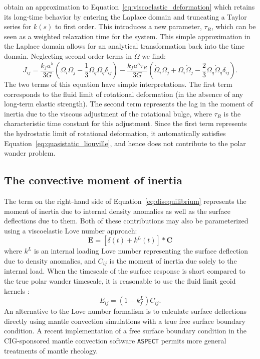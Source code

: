 \documentclass[preprint,12pt,authoryear]{elsarticle}
\begin{document}
\citet{ricard1993polar} obtain an approximation to Equation~\eqref{eq:viscoelastic_deformation} which retains its long-time behavior by entering the Laplace domain and truncating a Taylor series for $k(s)$ to first order.  
This introduces a new parameter, $\tau_R$, which can be seen as a weighted relaxation time for the system.  
This simple approximation in the Laplace domain allows for an analytical transformation back into the time domain. Neglecting second order terms in $\dot{\Omega}$ we find:
\begin{equation}
J_{ij} = \frac{k_f a^5}{3 G} \left( \Omega_i \Omega_j - \frac{1}{3} \Omega_q \Omega_q \delta_{ij} \right) -
 \frac{k_f a^5 \tau_R}{3G} \left(\dot{\Omega}_i \Omega_j + \Omega_i \dot{\Omega}_j - \frac{2}{3} \Omega_q \dot{\Omega}_q \delta_{ij} \right).
\label{eq:rotational_deformation}
\end{equation}
The two terms of this equation have simple interpretations.  
The first term corresponds to the fluid limit of rotational deformation (in the absence of any long-term elastic strength).  
The second term represents the lag in the moment of inertia due to the viscous adjustment of the rotational bulge, where $\tau_R$ is the characteristic time constant for this adjustment.
Since the first term represents the hydrostatic limit of rotational deformation, it automatically satisfies Equation~\eqref{eq:quasistatic_liouville}, and hence does not contribute to the polar wander problem.

\subsection{The convective moment of inertia}
\label{sec:convective_moment}

The term on the right-hand side of Equation~\eqref{eq:disequilibrium} represents the moment of inertia due to internal density anomalies as well as the surface deflections due to them.
Both of these contributions may also be parameterized using a viscoelastic Love number approach:
\begin{equation} 
\mathbf{E} = \left[ \delta(t) + k^L(t) \right] * \mathbf{C}
\end{equation}
where $k^L$ is an internal loading Love number representing the surface deflection due to density anomalies, 
and $C_{ij}$ is the moment of inertia due solely to the internal load.
When the timescale of the surface response is short compared to the true polar wander timescale, it is reasonable to  use the fluid limit geoid kernels \citep[e.g.][]{richards1984geoid}:  
\begin{equation}
E_{ij} = (1+k^L_f) C_{ij}.
\end{equation}
An alternative to the Love number formalism is to calculate surface deflections directly using mantle convection simulations with a true free surface boundary condition.
A recent implementation of a free surface boundary condition in the CIG-sponsored mantle convection software \texttt{ASPECT} \citep{rose2016free}
permits more general treatments of mantle rheology.
\end{document}
